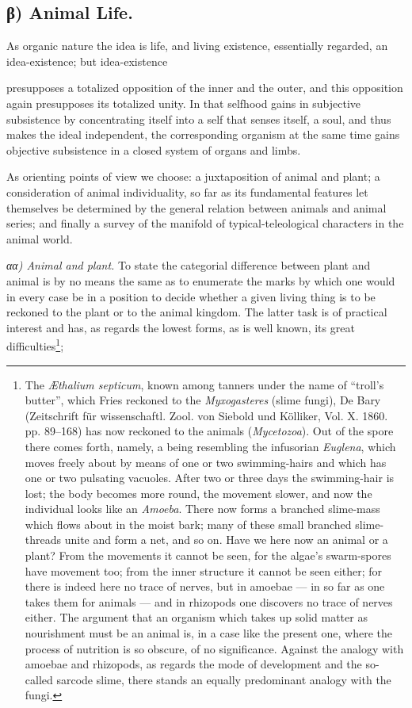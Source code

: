 \documentclass[12pt,a4paper]{book}
\begin{document}
\subsection*{β) Animal Life.}

As organic nature the idea is life, and living existence, essentially regarded, an
idea-existence; but idea-existence

\setcounter{footnote}{0}
presupposes a totalized opposition of the inner and the outer, and this opposition
again presupposes its totalized unity. In that selfhood gains in subjective
subsistence by concentrating itself into a self that senses itself, a soul, and
thus makes the ideal independent, the corresponding organism at the same time gains
objective subsistence in a closed system of organs and limbs.

As orienting points of view we choose: a juxtaposition of animal and plant; a
consideration of animal individuality, so far as its fundamental features let
themselves be determined by the general relation between animals and animal series;
and finally a survey of the manifold of typical-teleological characters in the
animal world.

\emph{αα) Animal and plant.} To state the categorial difference between plant and
animal is by no means the same as to enumerate the marks by which one would in
every case be in a position to decide whether a given living thing is to be
reckoned to the plant or to the animal kingdom. The latter task is of practical
interest and has, as regards the lowest forms, as is well known, its great
difficulties\footnote{The \textit{Æthalium septicum}, known among tanners under the
name of ``troll's butter'', which Fries reckoned to the \textit{Myxogasteres}
(slime fungi), De Bary (Zeitschrift für wissenschaftl. Zool. von Siebold und
Kölliker, Vol. X. 1860. pp. 89--168) has now reckoned to the animals
(\textit{Mycetozoa}). Out of the spore there comes forth, namely, a being
resembling the infusorian \textit{Euglena}, which moves freely about by means of
one or two swimming-hairs and which has one or two pulsating vacuoles. After two or
three days the swimming-hair is lost; the body becomes more round, the movement
slower, and now the individual looks like an \textit{Amoeba}. There now forms a
branched slime-mass which flows about in the moist bark; many of these small
branched slime-threads unite and form a net, and so on. Have we here now an animal
or a plant? From the movements it cannot be seen, for the algae's swarm-spores have
movement too; from the inner structure it cannot be
seen either; for there is indeed here no trace of nerves, but in amoebae --- in so
far as one takes them for animals --- and in rhizopods one discovers no trace of
nerves either. The argument that an organism which takes up solid matter as
nourishment must be an animal is, in a case like the present one, where the process
of nutrition is so obscure, of no significance. Against the analogy with amoebae
and rhizopods, as regards the mode of development and the so-called sarcode slime,
there stands an equally predominant analogy with the fungi.};
\end{document}

